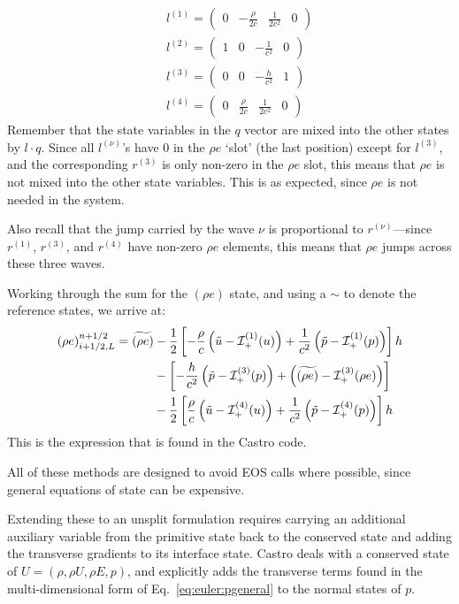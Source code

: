 \begin{eqnarray}
&&
l^{(1)} = ( \begin{array}{cccc} 0 & -\frac{\rho}{2c} & \frac{1}{2c^2} & 0
            \end{array} ) \nonumber \\
&&
l^{(2)} = ( \begin{array}{cccc} 1 & 0 & -\frac{1}{c^2} & 0
            \end{array} ) \nonumber \\
&&
l^{(3)} = ( \begin{array}{cccc} 0 & 0 & -\frac{h}{c^2} & 1
            \end{array} ) \nonumber \\
&&
l^{(4)} = ( \begin{array}{cccc} 0 & \frac{\rho}{2c} & \frac{1}{2c^2} & 0
            \end{array} )
\end{eqnarray}
Remember that the state variables in the $q$ vector are mixed into the
other states by $l \cdot q$.  Since all $l^{(\nu)}$'s have $0$ in the
$\rho e$ `slot' (the last position) except for $l^{(3)}$, and the
corresponding $r^{(3)}$ is only non-zero in the $\rho e$ slot, this
means that $\rho e$ is not mixed into the other state variables.  This
is as expected, since $\rho e$ is not needed in the system.

Also recall that the jump carried by the wave $\nu$ is proportional
to $r^{(\nu)}$---since $r^{(1)}$, $r^{(3)}$, and $r^{(4)}$ have
non-zero $\rho e$ elements, this means that $\rho e$ jumps across
these three waves.

Working through the sum for the $(\rho e)$ state, and using a $\sim$ to
denote the reference states, we arrive at:
\begin{align}
(\rho e)_{i+1/2,L}^{n+1/2} = \widetilde{(\rho e)} &-
   \frac{1}{2} \left [ -\frac{\rho}{c} \left (\tilde{u} - {\mathcal{I}}^{(1)}_+(u) \right )
                       +\frac{1}{c^2} \left (\tilde{p} - {\mathcal{I}}^{(1)}_+(p) \right )
               \right ] h \nonumber \\
  &-
    \left [ -\frac{h}{c^2} \left (\tilde{p} - {\mathcal{I}}^{(3)}_+(p) \right )
                       + \left (\widetilde{(\rho e)} - {\mathcal{I}}^{(3)}_+(\rho e) \right )
               \right ] \nonumber \\
  &-
   \frac{1}{2} \left [ \frac{\rho}{c} \left (\tilde{u} - {\mathcal{I}}^{(4)}_+(u) \right )
                       +\frac{1}{c^2} \left (\tilde{p} - {\mathcal{I}}^{(4)}_+(p) \right )
               \right ] h
\end{align}
This is the expression that is found in the Castro code.


All of these methods are designed to avoid EOS calls where possible,
since general equations of state can be expensive.

Extending these to an unsplit formulation requires carrying an additional
auxiliary variable from the primitive state back to the conserved state
and adding the transverse gradients to its interface state.  Castro
deals with a conserved state of $U = (\rho, \rho U, \rho E, p)$, and
explicitly adds the transverse terms found in the multi-dimensional form
of Eq.~\ref{eq:euler:pgeneral}
to the normal states of $p$.




